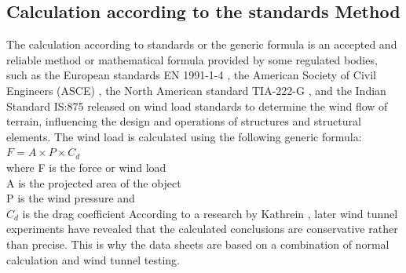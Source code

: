 {\subsection{ Calculation according to the standards Method}
The calculation according to standards or the generic formula is an accepted and reliable method or mathematical formula provided by some regulated bodies, such as the European standards EN 1991-1-4 \cite{en19911}, the American Society of Civil Engineers (ASCE) \cite{alinejad2020engineering}, the North American standard TIA-222-G \cite{rasool2021comparative}, and the Indian Standard IS:875 \cite{bhandari2011explanatory} released on wind load standards to determine the wind flow of terrain, influencing the design and operations of structures and structural elements. The wind load is calculated using the following generic formula:
\(F = A \times P \times C_d\)
\\
where F is the force or wind load\\
A is the projected area of the object \\
P is the wind pressure and\\
\(C_d\) is the drag coefficient \cite{kathrein_2016,huawei_2017}
According to a research by Kathrein \cite{kathrein_2016}, later wind tunnel experiments have revealed that the calculated conclusions are conservative rather than precise. This is why the data sheets are based on a combination of normal calculation and wind tunnel testing.





}
